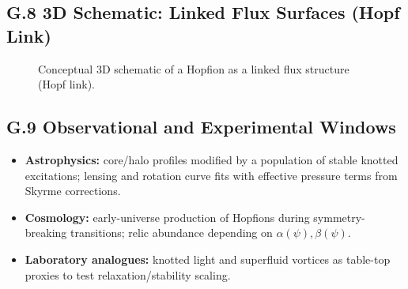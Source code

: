 \documentclass[12pt,a4paper]{article}
\begin{document}
\subsection*{G.8 3D Schematic: Linked Flux Surfaces (Hopf Link)}
\begin{figure}[h!]
\centering
{}
\caption{Conceptual 3D schematic of a Hopfion as a linked flux structure (Hopf link).}
\label{fig:hopf_link}
\end{figure}

\subsection*{G.9 Observational and Experimental Windows}
\begin{itemize}
\item \textbf{Astrophysics:} core/halo profiles modified by a population of stable knotted excitations; lensing and rotation curve fits with effective pressure terms from Skyrme corrections.
\item \textbf{Cosmology:} early-universe production of Hopfions during symmetry-breaking transitions; relic abundance depending on $\alpha(\psi),\beta(\psi)$.
\item \textbf{Laboratory analogues:} knotted light and superfluid vortices as table-top proxies to test relaxation/stability scaling.
\end{itemize}
\end{document}
